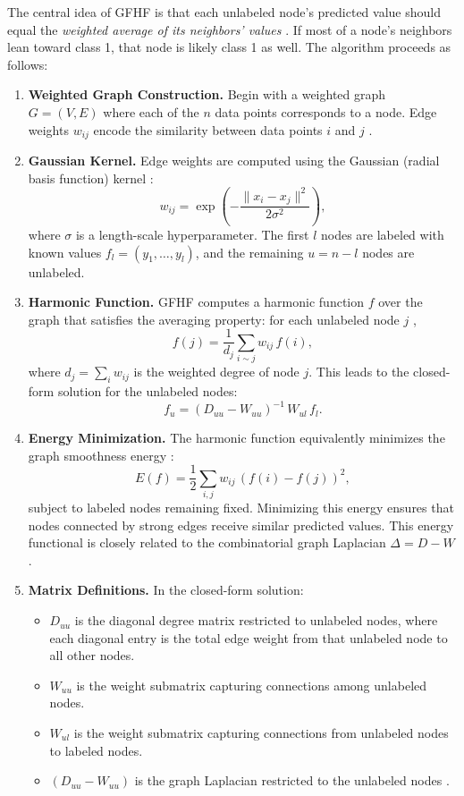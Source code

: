 \documentclass[12pt]{article}
\begin{document}
The central idea of GFHF is that each unlabeled node's predicted value should equal the \textit{weighted average of its neighbors' values} \cite{Zhu2003}. If most of a node's neighbors lean toward class 1, that node is likely class 1 as well. The algorithm proceeds as follows:

\begin{enumerate}

\item \textbf{Weighted Graph Construction.}
Begin with a weighted graph $G = (V, E)$ where each of the $n$ data points corresponds to a node. Edge weights $w_{ij}$ encode the similarity between data points $i$ and $j$ \cite{Zhu2003}.

\item \textbf{Gaussian Kernel.}
Edge weights are computed using the Gaussian (radial basis function) kernel \cite{Zhu2003}:
\[
w_{ij} = \exp\!\left(-\frac{\|x_i - x_j\|^2}{2\sigma^2}\right),
\]
where $\sigma$ is a length-scale hyperparameter. The first $l$ nodes are labeled with known values $f_l = (y_1, \ldots, y_l)$, and the remaining $u = n - l$ nodes are unlabeled.

\item \textbf{Harmonic Function.}
GFHF computes a harmonic function $f$ over the graph that satisfies the averaging property: for each unlabeled node $j$ \cite{Zhu2003},
\[
f(j) = \frac{1}{d_j} \sum_{i \sim j} w_{ij}\, f(i),
\]
where $d_j = \sum_{i} w_{ij}$ is the weighted degree of node $j$. This leads to the closed-form solution for the unlabeled nodes:
\[
f_u = (D_{uu} - W_{uu})^{-1}\, W_{ul}\, f_l.
\]

\item \textbf{Energy Minimization.}
The harmonic function equivalently minimizes the graph smoothness energy \cite{Zhu2003}:
\[
E(f) = \frac{1}{2} \sum_{i,j} w_{ij}\,(f(i) - f(j))^2,
\]
subject to labeled nodes remaining fixed. Minimizing this energy ensures that nodes connected by strong edges receive similar predicted values. This energy functional is closely related to the combinatorial graph Laplacian $\Delta = D - W$ \cite{Zhu2003}.

\item \textbf{Matrix Definitions.}
In the closed-form solution:
\begin{itemize}
\item $D_{uu}$ is the diagonal degree matrix restricted to unlabeled nodes, where each diagonal entry is the total edge weight from that unlabeled node to all other nodes.
\item $W_{uu}$ is the weight submatrix capturing connections among unlabeled nodes.
\item $W_{ul}$ is the weight submatrix capturing connections from unlabeled nodes to labeled nodes.
\item $(D_{uu} - W_{uu})$ is the graph Laplacian restricted to the unlabeled nodes \cite{Zhu2003}.
\end{itemize}

\end{enumerate}
\end{document}
